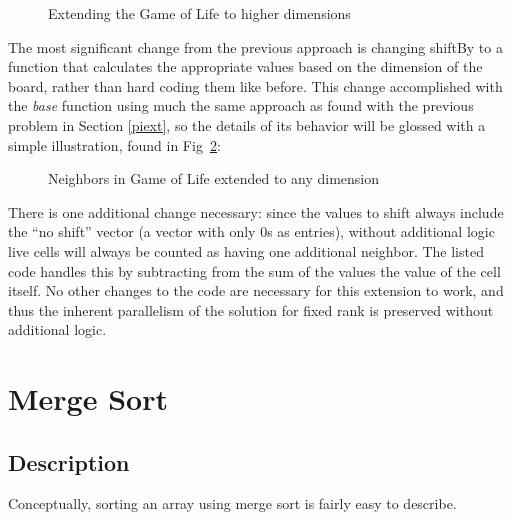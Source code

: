 \begin{figure}[h]
\begin{quote}
\begin{singlespacing}
\begin{small}
\end{small}
\end{singlespacing}
\end{quote}
\caption{Extending the Game of Life to higher dimensions}
\label{fig::gol_ext.ijs}
\end{figure}

The most significant change from the previous approach 
is changing \ttfamily shiftBy \normalfont to a function 
that calculates the appropriate values based on the dimension of the board, 
rather than hard coding them like before.
This change accomplished with the \textit{base} function using much the same approach 
as found with the previous problem in Section \ref{piext}, 
so the details of its behavior will be glossed with a simple illustration, 
found in Fig~\ref{fig::gol_ext}:

\begin{figure}
\begin{quote}
\begin{singlespacing}
\begin{small}
\end{small}
\end{singlespacing}
\end{quote}
\caption{Neighbors in Game of Life extended to any dimension}
\label{fig::gol_ext}
\end{figure}

There is one additional change necessary:
since the values to shift always include the ``no shift'' vector
(a vector with only 0s as entries),
without additional logic live cells will always be counted as 
having one additional neighbor. 
The listed code handles this by subtracting from 
the sum of the values the value of the cell itself.
No other changes to the code are necessary for this extension to work, 
and thus the inherent parallelism of the solution for fixed rank 
is preserved without additional logic.

\section{Merge Sort}
\label{mgdes}
\subsection{Description}
Conceptually, sorting an array using merge sort is fairly easy to describe.

